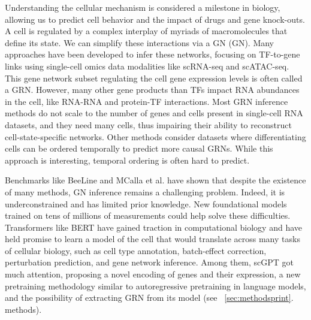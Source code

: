 Understanding the cellular mechanism is considered a milestone in biology, allowing us to predict cell behavior and the impact of drugs and gene knock-outs\citep{lahnemannElevenGrandChallenges2020, roohaniPredictingTranscriptionalOutcomes2024,gonzalezCombinatorialPredictionTherapeutic2024,haradaDistinctCoreRegulatory2022a,haradaLeukemiaCoreTranscriptional2023}. A cell is regulated by a complex interplay of myriads of macromolecules that define its state. We can simplify these interactions via a \gls{GN}\citep{badia-i-mompelGeneRegulatoryNetwork2023} (GN). Many approaches have been developed to infer these networks, focusing on \gls{TF}-to-gene links using single-cell omics data modalities like \gls{scRNA-seq} and \gls{scATAC-seq}\citep{littmanSCINGInferenceRobust2023,aibarSCENICSinglecellRegulatory2017,bravogonzalez-blasSCENICSinglecellMultiomic2023,suInferringGeneRegulatory2024,ganInferringGeneRegulatory2024, raharinirinaInferringGeneRegulatory2021,chenGraphAttentionNetwork2022,wangDictysDynamicGene2023,zhangInferenceCellTypespecific2023,wangInductiveInferenceGene2020,kamimotoDissectingCellIdentity2023,shuModelingGeneRegulatory2021}. This gene network subset regulating the cell gene expression levels is often called a \gls{GRN}. However, many other gene products than \gls{TF}s impact \gls{RNA} abundances in the cell, like \gls{RNA}-\gls{RNA} and protein-\gls{TF} interactions\citep{boijaTranscriptionFactorsActivate2018,gretafriarItTakesThree2023,oksuzTranscriptionFactorsInteract2023,talukdarTranscriptionalCoactivatorsEmerging2023,statelloGeneRegulationLong2021}. Most \gls{GRN} inference methods do not scale to the number of genes and cells present in single-cell \gls{RNA} datasets, and they need many cells, thus impairing their ability to reconstruct cell-state-specific networks. Other methods consider datasets where differentiating cells can be ordered temporally to predict more causal \gls{GRN}s. While this approach is interesting, temporal ordering is often hard to predict\citep{wangDictysDynamicGene2023,wangDecipheringDriverRegulators2023}.

Benchmarks like BeeLine\citep{pratapaBenchmarkingAlgorithmsGene2020} and MCalla et al.\citep{mccallaIdentifyingStrengthsWeaknesses2023} have shown that despite the existence of many methods, \gls{GN} inference remains a challenging problem. Indeed, it is underconstrained and has limited prior knowledge. New foundational models trained on tens of millions of measurements could help solve these difficulties. Transformers like \gls{BERT}\citep{vaswaniAttentionAllYou2023,devlinBERTPretrainingDeep2019} have gained traction in computational biology and have held promise to learn a model of the cell that would translate across many tasks of cellular biology, such as cell type annotation, batch-effect correction, perturbation prediction, and gene network inference\citep{theodorisTransferLearningEnables2023}. Among them, \gls{scGPT}\citep{cuiScGPTBuildingFoundation2024} got much attention, proposing a novel encoding of genes and their expression, a new pretraining methodology similar to autoregressive pretraining in language models, and the possibility of extracting \gls{GRN} from its model (see ~\ref{sec:methodsprint}. methods).

